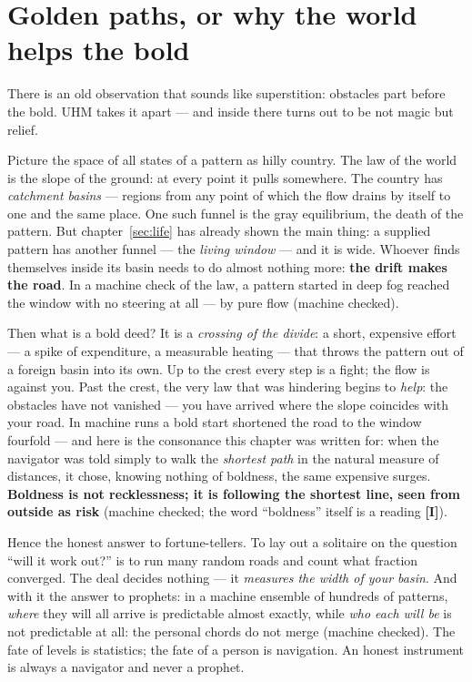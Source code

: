 \documentclass[11pt,letterpaper]{article}
\newcommand{\stI}{\textbf{[I]}\xspace}
\begin{document}
\section{Golden paths, or why the world helps the bold}
\label{sec:golden}

There is an old observation that sounds like superstition: obstacles
part before the bold. UHM takes it apart --- and inside there turns
out to be not magic but relief.

Picture the space of all states of a pattern as hilly country. The
law of the world is the slope of the ground: at every point it pulls
somewhere. The country has \emph{catchment basins} --- regions from
any point of which the flow drains by itself to one and the same
place. One such funnel is the gray equilibrium, the death of the
pattern. But chapter~\ref{sec:life} has already shown the main
thing: a supplied pattern has another funnel --- the \emph{living
window} --- and it is wide. Whoever finds themselves inside its
basin needs to do almost nothing more: \textbf{the drift makes the
road}. In a machine check of the law, a pattern started in deep fog
reached the window with no steering at all --- by pure flow
(machine checked).

Then what is a bold deed? It is a \emph{crossing of the divide}: a
short, expensive effort --- a spike of expenditure, a measurable
heating --- that throws the pattern out of a foreign basin into its
own. Up to the crest every step is a fight; the flow is against you.
Past the crest, the very law that was hindering begins to
\emph{help}: the obstacles have not vanished --- you have arrived
where the slope coincides with your road. In machine runs a bold
start shortened the road to the window fourfold --- and here is the
consonance this chapter was written for: when the navigator was told
simply to walk the \emph{shortest path} in the natural measure of
distances, it chose, knowing nothing of boldness, the same expensive
surges. \textbf{Boldness is not recklessness; it is following the
shortest line, seen from outside as risk} (machine checked; the
word ``boldness'' itself is a reading \stI).

Hence the honest answer to fortune-tellers. To lay out a solitaire
on the question ``will it work out?'' is to run many random roads
and count what fraction converged. The deal decides nothing --- it
\emph{measures the width of your basin}. And with it the answer to
prophets: in a machine ensemble of hundreds of patterns,
\emph{where} they will all arrive is predictable almost exactly,
while \emph{who each will be} is not predictable at all: the
personal chords do not merge (machine checked). The fate of levels
is statistics; the fate of a person is navigation. An honest
instrument is always a navigator and never a prophet.
\end{document}
